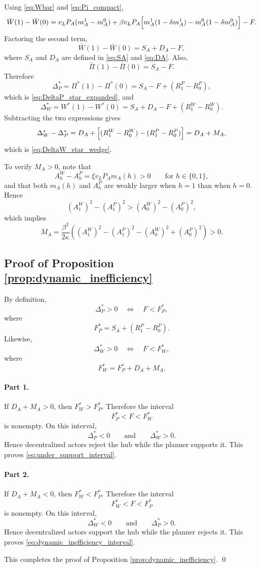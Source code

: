 Using \eqref{eq:Wbar} and \eqref{eq:Pi_compact},
\[
\bar W(1)-\bar W(0)
=
v_LP_A(m_A^1-m_A^0)
+
\beta v_LP_A\Bigl[m_A^1(1-\delta m_A^1)-m_A^0(1-\delta m_A^0)\Bigr]
-F.
\]
Factoring the second term,
\[
\bar W(1)-\bar W(0)=S_A+D_A-F,
\]
where $S_A$ and $D_A$ are defined in \eqref{eq:SA} and \eqref{eq:DA}. Also,
\[
\bar\Pi(1)-\bar\Pi(0)=S_A-F.
\]
Therefore
\[
\Delta_P^*=\Pi^*(1)-\Pi^*(0)=S_A-F+(R_1^P-R_0^P),
\]
which is \eqref{eq:DeltaP_star_expanded}, and
\[
\Delta_W^*=W^*(1)-W^*(0)=S_A+D_A-F+(R_1^W-R_0^W).
\]
Subtracting the two expressions gives
\[
\Delta_W^*-\Delta_P^*
=
D_A+\Bigl[(R_1^W-R_0^W)-(R_1^P-R_0^P)\Bigr]
=
D_A+M_A,
\]
which is \eqref{eq:DeltaW_star_wedge}.

To verify $M_A>0$, note that
\[
A_h^W-A_h^P=\xi v_LP_A m_A(h)>0
\qquad
\text{for } h\in\{0,1\},
\]
and that both $m_A(h)$ and $A_h^P$ are weakly larger when $h=1$ than when $h=0$. Hence
\[
(A_1^W)^2-(A_1^P)^2>(A_0^W)^2-(A_0^P)^2,
\]
which implies
\[
M_A
=
\frac{\beta^2}{2\kappa}
\left(
(A_1^W)^2-(A_1^P)^2-(A_0^W)^2+(A_0^P)^2
\right)
>0.
\]

\subsection{Proof of Proposition \ref{prop:dynamic_inefficiency}}

By definition,
\[
\Delta_P^*>0
\quad\Longleftrightarrow\quad
F<F_P^*,
\]
where
\[
F_P^*=S_A+(R_1^P-R_0^P).
\]
Likewise,
\[
\Delta_W^*>0
\quad\Longleftrightarrow\quad
F<F_W^*,
\]
where
\[
F_W^*=F_P^*+D_A+M_A.
\]

\paragraph{Part 1.}
If $D_A+M_A>0$, then $F_W^*>F_P^*$. Therefore the interval
\[
F_P^*<F<F_W^*
\]
is nonempty. On this interval,
\[
\Delta_P^*<0
\qquad\text{and}\qquad
\Delta_W^*>0.
\]
Hence decentralized actors reject the hub while the planner supports it. This proves \eqref{eq:under_support_interval}.

\paragraph{Part 2.}
If $D_A+M_A<0$, then $F_W^*<F_P^*$. Therefore the interval
\[
F_W^*<F<F_P^*
\]
is nonempty. On this interval,
\[
\Delta_W^*<0
\qquad\text{and}\qquad
\Delta_P^*>0.
\]
Hence decentralized actors support the hub while the planner rejects it. This proves \eqref{eq:dynamic_inefficiency_interval}.

This completes the proof of Proposition \ref{prop:dynamic_inefficiency}.
\qed
